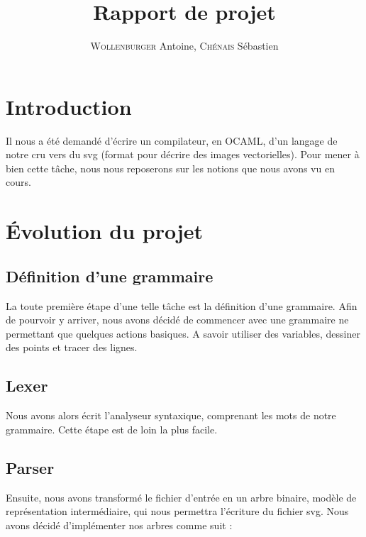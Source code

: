 \documentclass[11pt]{report} %
\title{Rapport de projet}
\author{\textsc{Wollenburger} Antoine, \textsc{Chénais} Sébastien}
\date{} %
\renewcommand{\headrulewidth}{0pt} %
\begin{document}
\fancyfoot[LE,CE,RE,LO,CO,RO]{}

\renewcommand{\footrulewidth}{0.4pt}

\maketitle

\renewcommand{\contentsname}{Sommaire} %
\tableofcontents

\chapter*{Introduction}
Il nous a été demandé d'écrire un compilateur, en OCAML, d'un langage de notre cru vers du svg (format pour décrire des images vectorielles). Pour mener à bien cette tâche, nous nous reposerons sur les notions que nous avons vu en cours.

\chapter{Évolution du projet}
\section{Définition d'une grammaire}
La toute première étape d'une telle tâche est la définition d'une grammaire. Afin de pourvoir y arriver, nous avons décidé de commencer avec une grammaire ne permettant que quelques actions basiques. A savoir utiliser des variables, dessiner des points et tracer des lignes.

\section{Lexer}
Nous avons alors écrit l'analyseur syntaxique, comprenant les mots de notre grammaire. Cette étape est de loin la plus facile.

\section{Parser}
Ensuite, nous avons transformé le fichier d'entrée en un arbre binaire, modèle de représentation intermédiaire, qui nous permettra l'écriture du fichier svg. %
Nous avons décidé d'implémenter nos arbres comme suit : 
\end{document}
